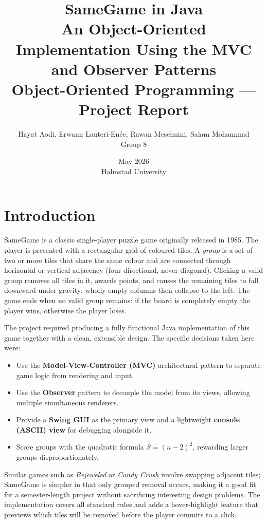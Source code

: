 \documentclass[12pt,a4paper]{article}
\title{%
  \textbf{SameGame in Java}\\[0.4em]
  \large An Object-Oriented Implementation Using the MVC and Observer Patterns\\[0.2em]
  \normalsize Object-Oriented Programming --- Project Report
}
\author{%
  Hayat Aodi, Erwann Lanteri-Enée, Rawan Meselmini, Salam Mohammad\\[0.4em]
  \normalsize Group 8
}
\date{May 2026 \\ Halmstad University}
\begin{document}
\maketitle
\tableofcontents
\newpage

\section{Introduction}
\label{sec:intro}

SameGame is a classic single-player puzzle game originally released in 1985.
The player is presented with a rectangular grid of coloured tiles.
A \emph{group} is a set of two or more tiles that share the same colour and are
connected through horizontal or vertical adjacency (four-directional, never
diagonal).
Clicking a valid group removes all tiles in it, awards points, and causes the
remaining tiles to fall downward under gravity; wholly empty columns then
collapse to the left.
The game ends when no valid group remains: if the board is completely empty the
player wins, otherwise the player loses.

The project required producing a fully functional Java implementation of this
game together with a clean, extensible design.
The specific decisions taken here were:

\begin{itemize}
  \item Use the \textbf{Model-View-Controller (MVC)} architectural pattern to
        separate game logic from rendering and input.
  \item Use the \textbf{Observer} pattern to decouple the model from its views,
        allowing multiple simultaneous renderers.
  \item Provide a \textbf{Swing GUI} as the primary view and a lightweight
        \textbf{console (ASCII) view} for debugging alongside it.
  \item Score groups with the quadratic formula $S = (n-2)^2$, rewarding
        larger groups disproportionately.
\end{itemize}

Similar games such as \emph{Bejeweled} or \emph{Candy Crush} involve
swapping adjacent tiles; SameGame is simpler in that only grouped removal
occurs, making it a good fit for a semester-length project without sacrificing
interesting design problems.
The implementation covers all standard rules and adds a hover-highlight
feature that previews which tiles will be removed before the player commits to
a click.
\end{document}
